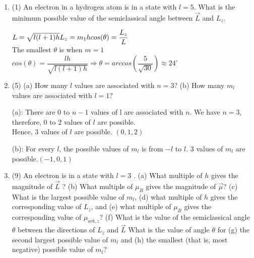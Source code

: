 \documentclass[fleqn]{article}
\begin{document}
  \begin{enumerate}
    \item (1) An electron in a hydrogen atom is in a state with $l=5$. What is the minimum possible value of the semiclassical angle between $\overrightarrow{L}$ and $L_z$.

      \textcolor{hwColor}{  
        $ 
          L=\sqrt{l(l+1)h} \\
          L_z=m_1h \\
          cos(\theta)=\dfrac{L_z}{L} 
        $ \\
        The smallest $\theta$ is when $m=1$ \\
        $
          cos(\theta)=\dfrac{lh}{\sqrt{l(l+1)h}} \Longrightarrow \theta=arccos(\dfrac{5}{\sqrt{30}}) \approx 24^\circ
        $
      } 

    \item (5) (a) How many $l$ values are associated with $n=3$? (b) How many $m_l$ values are associated with $l=1$?

      \textcolor{hwColor}{  
        (a): There are $0$ to $n-1$ values of l are associated with $n$. We have $n=3$, therefore, $0$ to $2$ values of $l$ are possible. \\
        Hence, 3 values of $l$ are possible. $(0,1,2)$
      }

      \textcolor{hwColor}{
        (b): For every $l$, the possible values of $m_l$ is from $-l$ to $l$. 3 values of $m_l$ are possible.$ (-1, 0, 1)$
      }

    \item (9) An electron is in a state with $l=3$ . (a) What multiple of $h$ gives the magnitude of $\overrightarrow{L}$ ? (b) What multiple of $\mu_B$ gives the magnitude of $\overrightarrow{\mu}$? (c) What is the largest possible value of $m_l$, (d) what multiple of $h$ gives the corresponding value of $L_z$, and (e) what multiple of $\mu_B$ gives the corresponding value of $\mu_{orb,z}$? (f) What is the value of the semiclassical angle $\theta$ between the directions of $L_z$ and $\overrightarrow{L}$ What is the value of angle $\theta$ for (g) the second largest possible value of $m_l$ and (h) the smallest (that is, most negative) possible value of $m_l$?
    

\end{enumerate}
\end{document}
